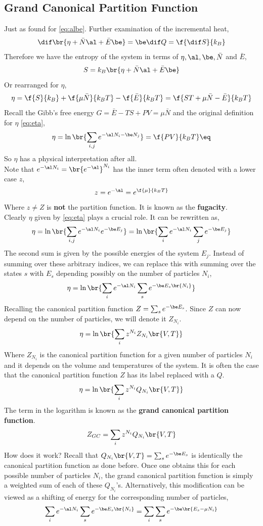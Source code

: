 \documentclass{article}
\begin{document}
{\subsection{Grand Canonical Partition Function}
Just as found for \eqref{eq:albe}. Further examination of the incremental heat,
\[ \dif \br{\eta + \bar{N} \al + \bar{E} \be} = \be\dif Q = \f{\dif S}{k_B} \]
Therefore we have the entropy of the system in terms of $\eta, \al, \be, \bar{N}$ and $\bar{E}$,
\[ S = k_B \br{\eta + \bar{N} \al + \bar{E} \be} \]
Or rearranged for $\eta$,
\[ \eta = \f{S}{k_B} + \f{\mu\bar{N}}{k_B T} - \f{\bar{E}}{k_BT} = \f{ST + \mu\bar{N} - \bar{E}}{k_BT} \]
Recall the Gibb's free energy $G = \bar{E} - TS + PV = \mu \bar{N}$ and the original definition for $\eta$ \eqref{eq:eta},
\[ \eta = \ln \br{\sum_{i,j} e^{-\al N_i - \be N_j}} = \f{PV}{k_B T} \eq \label{eq:eta}\]
So $\eta$ has a physical interpretation after all. \\

Note that $e^{-\al N_i} = \br{e^{-\al}}^{N_i}$ has the inner term often denoted with a lower case $z$,
\[ z = e^{-\al} = e^{\f{\mu}{k_B T}}\]
Where $z \neq Z$ is \textbf{not} the partition function. It is known as the \textbf{fugacity}. \\

Clearly $\eta$ given by \eqref{eq:eta} plays a crucial role. It can be rewritten as,
\[ \eta  = \ln \br{\sum_{i,j} e^{-\al N_i} e^{-\be E_j}}  = \ln \br{\sum_{i} e^{-\al N_i} \sum_{j}e^{-\be E_j}} \]
The second sum is given by the possible energies of the system $E_j$. Instead of summing over these arbitrary indices, we can replace this with summing over the states $s$ with $E_s$ depending possibly on the number of particles $N_i$,
\[ \eta  = \ln \br{\sum_{i} e^{-\al N_i} \sum_{s}e^{-\be E_s\br{N_i}}} \]
Recalling the canonical partition function $Z = \sum_s e^{-\be E_s}$. Since $Z$ can now depend on the number of particles, we will denote it $Z_{N_i}$.
\[ \eta  = \ln \br{\sum_{i}z^{N_i} Z_{N_i} \br{V,T}} \]
Where $Z_{N_i}$ is the canonical partition function for a given number of particles $N_i$ and it depends on the volume and temperatures of the system. It is often the case that the canonical partition function $Z$ has its label replaced with a $Q$.
\[ \eta  = \ln \br{\sum_{i} z^{N_i} Q_{N_i} \br{V,T}} \]
The term in the logarithm is known as the \textbf{grand canonical partition function}.
\[ Z_{GC} = \sum_{i} z^{N_i} Q_{N_i} \br{V,T} \]
How does it work? Recall that $Q_{N_i} \br{V,T} = \sum_s e^{-\be E_s}$ is identically the canonical partition function as done before. Once one obtains this for each possible number of particles $N_i$, the grand canonical partition function is simply a weighted sum of each of these $Q_{N_i}$'s. Alternatively, this modification can be viewed as a shifting of energy for the corresponding number of particles,
\[ \sum_{i} e^{-\al N_i} \sum_{s}e^{-\be E_s\br{N_i}} = \sum_{i} \sum_{s}e^{-\be\br{E_s - \mu N_i}} \]

}
\end{document}
